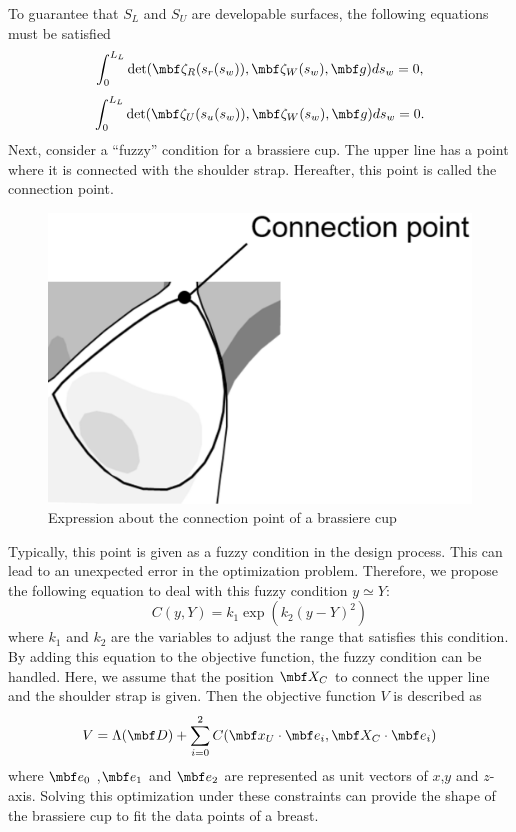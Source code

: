 \documentclass[E]{scitrans}
\begin{document}
To guarantee that $ S_L $ and $ S_U $  are developable surfaces, the following equations must be satisfied 
\begin{equation}\label{eq:conds_DevSur1}
	\int_{0}^{L_L} \det (\zetavec_R(s_r(s_w)), \zetavec_W(s_w), \mbold{g}) ds_w = 0,
\end{equation}
\begin{equation}\label{eq:conds_DevSur2}
	\int_{0}^{L_L} \det (\zetavec_U(s_u(s_w)), \zetavec_W(s_w), \mbold{g}) ds_w = 0.
\end{equation}
Next, consider a “fuzzy” condition for a brassiere cup. The upper line has a point where it is connected with the shoulder strap. Hereafter, this point is called the connection point. 
\begin{figure}[!h]
	\centering
	\includegraphics[width = 0.7\columnwidth]{./figure/Connection_Point.eps}
	\caption{Expression about the connection point of a brassiere cup}
	\label{fig:aboutCP}
\end{figure}
Typically, this point is given as a fuzzy condition in the design process. This can lead to an unexpected error in the optimization problem. Therefore, we propose the following equation to deal with this fuzzy condition $ y \simeq Y $:
\begin{equation}\label{eq:FuzzyEq}
C(y,Y) = k_1 \exp( k_2(y-Y)^2 )
\end{equation}
where $ k_1 $ and $ k_2 $ are the variables to adjust the range that satisfies this condition. By adding this equation to the objective function, the fuzzy condition can be handled. Here, we assume that the position $ \mbold{X}_C $ to connect the upper line and the shoulder strap is given. Then the objective function $ V $ is described as
\begin{equation}\label{eq:ObjectFunc}
V = \Lambda(\mbold{D}) + \sum_{i=0}^{2} C(\mbold{x}_U \cdot \mbold{e}_i , \mbold{X}_C \cdot \mbold{e}_i)
\end{equation}
where $\mbold{e}_0 $ ,$\mbold{e}_1 $ and $\mbold{e}_2 $ are represented as unit vectors of $ x $,$ y $ and $ z $-axis. Solving this optimization under these constraints can provide the shape of the brassiere cup to fit the data points of a breast.
\end{document}
